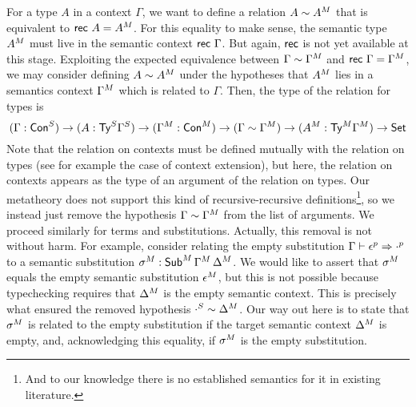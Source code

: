 For a type $A$ in a context $\Gamma$, we want to define a relation
$A\sim {A}^M$ that is equivalent to $\mathsf{rec}\,\,A={A}^M$.
For this equality to make sense, the semantic type ${A}^M$ must live
in the semantic context $\mathsf{rec}\,\,\Gamma$. But again, $\mathsf{rec}$ is not
yet available at this stage. Exploiting the expected equivalence between
$\Gamma\sim{\Gamma}^M$ and $\mathsf{rec}\,\,\Gamma={\Gamma}^M$, we may consider defining $A\sim{A}^M$ under the
hypotheses that ${A}^M$ lies in a semantics context ${\Gamma}^M$ which is
related to $\Gamma$. Then, the type of the relation for types is
\[
  (\Gamma : {\mathsf{Con}}^S)\rightarrow (A : {\mathsf{Ty}}^S{\Gamma}^S) \rightarrow
  ({\Gamma}^M : {\mathsf{Con}}^M)
  \rightarrow
  (\Gamma \sim {\Gamma}^M)
  \rightarrow
  ({A}^M:{\mathsf{Ty}}^M{\Gamma}^M)
  \rightarrow
  \mathsf{Set}
\]
Note that the relation on contexts
must be defined mutually with the relation on types (see for example the case of
context extension), but here, the relation on contexts appears as the type of an
argument of the relation on types.
Our metatheory does not support this kind of recursive-recursive
definitions\footnote{And to our knowledge there is no established semantics for
it in existing literature.}, so we instead just remove the hypothesis
$\Gamma\sim{\Gamma}^M$ from the list of arguments.  We proceed similarly for
terms and substitutions. Actually, this removal is not without harm. For
example, consider relating the empty substitution
$\Gamma\vdash {\epsilon}^p \Rightarrow {\cdot}^p $ to a semantic substitution
${\sigma}^M : {\mathsf{Sub}}^M\,{\Gamma}^M\,{\Delta}^M$. We would like to assert
that ${\sigma}^M$ equals the empty semantic substitution ${\epsilon}^M$, but
this is not possible because typechecking requires that ${\Delta}^M$ is the
empty semantic context. This is precisely what ensured the removed hypothesis
${\cdot}^S \sim {\Delta}^M$.  Our way out here is to state that ${\sigma}^M$
is related to the empty substitution if the target semantic context ${\Delta}^M$
is empty, and, acknowledging this equality, if ${\sigma}^M$ is the empty
substitution.

